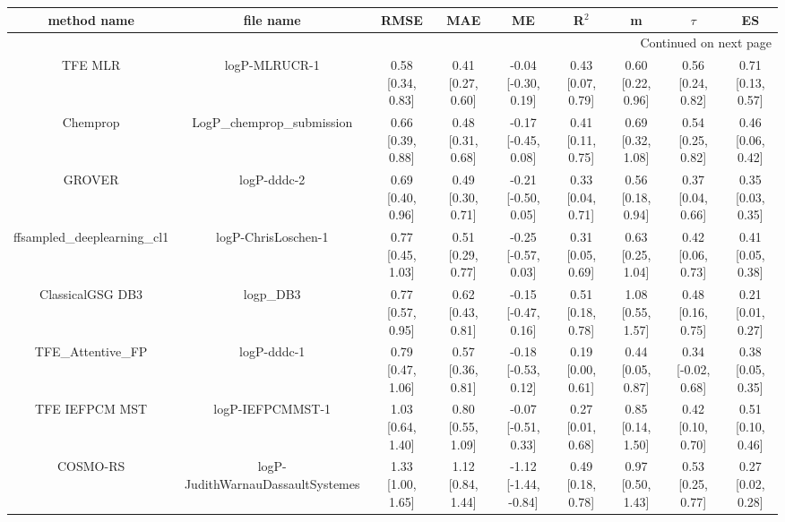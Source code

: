 \documentclass{article}
\begin{document}
\begin{center}
\scriptsize
\begin{longtable}{|ccccccccc|}
\toprule
                method name &                                   file name &               RMSE &                MAE &                    ME &              R$^2$ &                     m &                $\tau$ &                    ES \\
\midrule
\endhead
\midrule
\multicolumn{9}{r}{{Continued on next page}} \\
\midrule
\endfoot

\bottomrule
\endlastfoot
                    TFE MLR &                               logP-MLRUCR-1 &  0.58 [0.34, 0.83] &  0.41 [0.27, 0.60] &   -0.04 [-0.30, 0.19] &  0.43 [0.07, 0.79] &     0.60 [0.22, 0.96] &     0.56 [0.24, 0.82] &     0.71 [0.13, 0.57] \\
                   Chemprop &                  LogP\_chemprop\_submission &  0.66 [0.39, 0.88] &  0.48 [0.31, 0.68] &   -0.17 [-0.45, 0.08] &  0.41 [0.11, 0.75] &     0.69 [0.32, 1.08] &     0.54 [0.25, 0.82] &     0.46 [0.06, 0.42] \\
                     GROVER &                                 logP-dddc-2 &  0.69 [0.40, 0.96] &  0.49 [0.30, 0.71] &   -0.21 [-0.50, 0.05] &  0.33 [0.04, 0.71] &     0.56 [0.18, 0.94] &     0.37 [0.04, 0.66] &     0.35 [0.03, 0.35] \\
 ffsampled_deeplearning_cl1 &                         logP-ChrisLoschen-1 &  0.77 [0.45, 1.03] &  0.51 [0.29, 0.77] &   -0.25 [-0.57, 0.03] &  0.31 [0.05, 0.69] &     0.63 [0.25, 1.04] &     0.42 [0.06, 0.73] &     0.41 [0.05, 0.38] \\
           ClassicalGSG DB3 &                                   logp\_DB3 &  0.77 [0.57, 0.95] &  0.62 [0.43, 0.81] &   -0.15 [-0.47, 0.16] &  0.51 [0.18, 0.78] &     1.08 [0.55, 1.57] &     0.48 [0.16, 0.75] &     0.21 [0.01, 0.27] \\
           TFE_Attentive_FP &                                 logP-dddc-1 &  0.79 [0.47, 1.06] &  0.57 [0.36, 0.81] &   -0.18 [-0.53, 0.12] &  0.19 [0.00, 0.61] &     0.44 [0.05, 0.87] &    0.34 [-0.02, 0.68] &     0.38 [0.05, 0.35] \\
             TFE IEFPCM MST &                            logP-IEFPCMMST-1 &  1.03 [0.64, 1.40] &  0.80 [0.55, 1.09] &   -0.07 [-0.51, 0.33] &  0.27 [0.01, 0.68] &     0.85 [0.14, 1.50] &     0.42 [0.10, 0.70] &     0.51 [0.10, 0.46] \\
                   COSMO-RS &           logP-JudithWarnauDassaultSystemes &  1.33 [1.00, 1.65] &  1.12 [0.84, 1.44] &  -1.12 [-1.44, -0.84] &  0.49 [0.18, 0.78] &     0.97 [0.50, 1.43] &     0.53 [0.25, 0.77] &     0.27 [0.02, 0.28] \\

\end{longtable}
\end{center}
\end{document}
